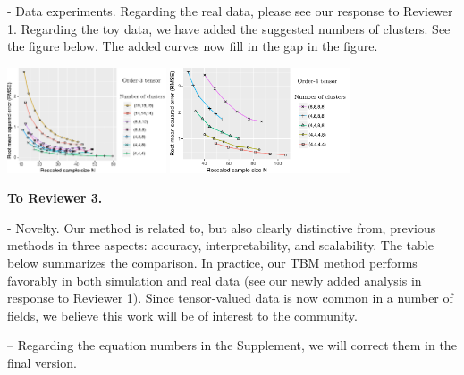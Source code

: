 \documentclass{article}
\begin{document}
- Data experiments. Regarding the real data, please see our response to Reviewer 1. Regarding the toy data, we have added the suggested numbers of clusters. See the figure below. The added curves now fill in the gap in the figure. 
\vspace{-.15cm}
\begin{center}
\includegraphics[width=4.7cm]{figure.pdf}
\hspace{.6cm}
\includegraphics[width=5.3cm]{rescale_order4.pdf}
\end{center}
\vspace{-.6cm}

{\bf To Reviewer 3.}
\vspace{-.15cm}

- Novelty. Our method is related to, but also clearly distinctive from, previous methods in three aspects: accuracy, interpretability, and scalability.  The table below summarizes the comparison. In practice, our TBM method performs favorably in both simulation and real data (see our newly added analysis in response to Reviewer 1). Since tensor-valued data is now common in a number of fields, we believe this work will be of interest to the community. 

\vspace{-.1cm}
\vspace{-.15cm}

-- Regarding the equation numbers in the Supplement, we will correct them in the final version. 
\end{document}
